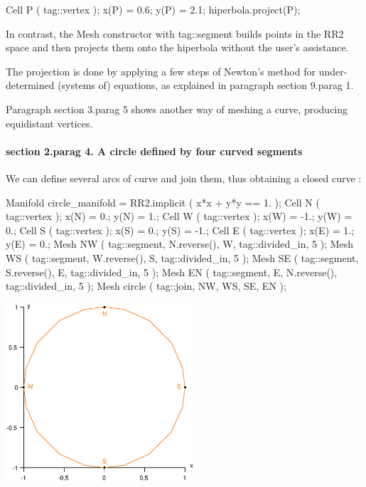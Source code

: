 \verbatim
   Cell P ( tag::vertex );  x(P) = 0.6;   y(P) = 2.1;
   hiperbola.project(P);
\endverbatim

\noindent In contrast, the {\codett Mesh} constructor with {\codett tag::segment} builds points
in the {\codett RR2} space and then projects them onto the {\codett hiperbola}
without the user's assistance.

The projection is done by applying a few steps of Newton's method for under-determined
(systems of) equations, as explained in paragraph \numb section 9.\numb parag 1.

Paragraph \numb section 3.\numb parag 5 shows another way of meshing a curve,
producing equidistant vertices.


\paragraph{\numb section 2.\numb parag 4. A circle defined by four curved segments}

We can define several arcs of curve and {\codett join} them, thus obtaining a closed curve :
\medskip

\verbatim
   Manifold circle_manifold = RR2.implicit ( x*x + y*y == 1. );
   Cell N ( tag::vertex );  x(N) =  0.;   y(N) =  1.;
   Cell W ( tag::vertex );  x(W) = -1.;   y(W) =  0.;
   Cell S ( tag::vertex );  x(S) =  0.;   y(S) = -1.;
   Cell E ( tag::vertex );  x(E) =  1.;   y(E) =  0.;
   Mesh NW ( tag::segment, N.reverse(), W, tag::divided_in, 5 );
   Mesh WS ( tag::segment, W.reverse(), S, tag::divided_in, 5 );
   Mesh SE ( tag::segment, S.reverse(), E, tag::divided_in, 5 );
   Mesh EN ( tag::segment, E, N.reverse(), tag::divided_in, 5 );
   Mesh circle ( tag::join, NW, WS, SE, EN );
\endverbatim

{ 
\centerline{\includegraphics[width=70mm]{circle.eps}} }

